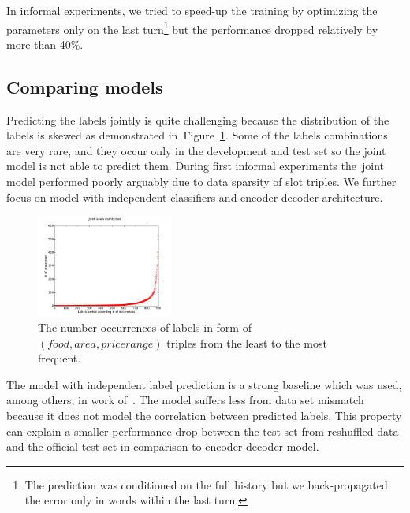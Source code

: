 \documentclass{itatnew}
\begin{document}
In informal experiments, we tried to speed-up the training by  optimizing the parameters only on the last turn\footnote{The prediction was conditioned on the full history but we back-propagated the error only in words within the last turn.} but the performance dropped relatively by more than 40\%.

\subsection{Comparing models}
\label{sec:eval}

Predicting the labels jointly is quite challenging because the distribution of the labels is skewed as demonstrated in~Figure~\ref{fig:labels}.
Some of the labels combinations are very rare, and they occur only in the development and test set so the joint model is not able to predict them.
During first informal experiments the~joint model performed poorly arguably due to data sparsity of slot triples. We further focus on model with independent classifiers and encoder-decoder architecture.

\begin{figure}
\vspace{-0.80em}
    \begin{center}
\includegraphics[width=0.4\textwidth]{jointLabelsDistrib}
    \end{center}
\vspace{-1.80em}
\caption{The number occurrences of labels in form of $(food, area, pricerange)$ triples from the least to the most frequent.}
\label{fig:labels}
\end{figure}

The model with independent label prediction is a strong baseline which was used, among others, in work of~\cite{zilka2015incremental}.
The model suffers less from data set mismatch because it does not model the correlation between predicted labels.
This property can explain a smaller performance drop between the test set from reshuffled data and the official test set in comparison to encoder-decoder model.
\end{document}
